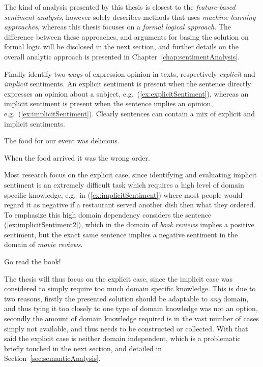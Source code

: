 The kind of analysis presented by this thesis is closest to the \emph{feature-based sentiment analysis}, however \citeauthor{webDataMining}  solely describes methods that uses \emph{machine learning approaches}, whereas this thesis focuses on a \emph{formal logical approach}. The difference between these approaches, and arguments for basing the solution on formal logic will be disclosed in the next section, and further details on the overall analytic approach is presented in Chapter~\ref{chap:sentimentAnalysis}.

Finally \citeauthor{webDataMining}  identify two \emph{ways} of expression opinion in texts, respectively \emph{explicit} and \emph{implicit} sentiments. An explicit sentiment is present when the sentence directly expresses an opinion about a subject, e.g.\ (\ref{ex:explicitSentiment}), whereas an implicit sentiment is present when the sentence implies an opinion, e.g.\ (\ref{ex:implicitSentiment}). Clearly sentences can contain a mix of explicit and implicit sentiments.
\begin{numquote}
	 The food for our event was delicious.
	\label{ex:explicitSentiment}
\end{numquote}
\begin{numquote}
	 When the food arrived it was the wrong order.
	\label{ex:implicitSentiment}
\end{numquote}

Most research focus on the explicit case, since identifying and evaluating implicit sentiment is an extremely difficult task which requires a high level of domain specific knowledge, e.g.\ in (\ref{ex:implicitSentiment}) where most people would regard it as negative if a restaurant served another dish then what they ordered. To emphasize this high domain dependency \citeauthor{omsa}  considers the sentence (\ref{ex:implicitSentiment2}), which in the domain of \emph{book reviews} implies a positive sentiment, but the exact same sentence implies a negative sentiment in the domain of \emph{movie reviews}.
\begin{numquote}
	 Go read the book!
	\label{ex:implicitSentiment2}
\end{numquote}

The thesis will thus focus on the explicit case, since the implicit case was considered to simply require too much domain specific knowledge. This is due to two reasons, firstly the presented solution should be adaptable to \emph{any} domain, and thus tying it too closely to one type of domain knowledge was not an option, secondly the amount of domain knowledge required is in the vast number of cases simply not available, and thus needs to be constructed or collected. With that said the explicit case is neither domain independent, which is a problematic briefly touched in the next section, and detailed in Section~\ref{sec:semanticAnalysis}.

